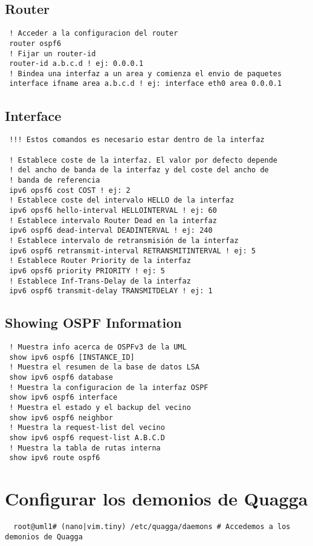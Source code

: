 \documentclass{article}
\begin{document}
\subsection{Router}
\begin{verbatim}
 ! Acceder a la configuracion del router
 router ospf6
 ! Fijar un router-id
 router-id a.b.c.d ! ej: 0.0.0.1
 ! Bindea una interfaz a un area y comienza el envio de paquetes
 interface ifname area a.b.c.d ! ej: interface eth0 area 0.0.0.1
\end{verbatim}

\subsection{Interface}
\begin{verbatim}
 !!! Estos comandos es necesario estar dentro de la interfaz

 ! Establece coste de la interfaz. El valor por defecto depende
 ! del ancho de banda de la interfaz y del coste del ancho de
 ! banda de referencia
 ipv6 opsf6 cost COST ! ej: 2
 ! Establece coste del intervalo HELLO de la interfaz
 ipv6 opsf6 hello-interval HELLOINTERVAL ! ej: 60
 ! Establece intervalo Router Dead en la interfaz
 ipv6 ospf6 dead-interval DEADINTERVAL ! ej: 240
 ! Establece intervalo de retransmisión de la interfaz
 ipv6 ospf6 retransmit-interval RETRANSMITINTERVAL ! ej: 5
 ! Establece Router Priority de la interfaz
 ipv6 opsf6 priority PRIORITY ! ej: 5
 ! Establece Inf-Trans-Delay de la interfaz
 ipv6 ospf6 transmit-delay TRANSMITDELAY ! ej: 1
\end{verbatim}

\subsection{Showing OSPF Information}
\begin{verbatim}
 ! Muestra info acerca de OSPFv3 de la UML
 show ipv6 ospf6 [INSTANCE_ID]
 ! Muestra el resumen de la base de datos LSA
 show ipv6 ospf6 database
 ! Muestra la configuracion de la interfaz OSPF
 show ipv6 ospf6 interface
 ! Muestra el estado y el backup del vecino
 show ipv6 ospf6 neighbor
 ! Muestra la request-list del vecino
 show ipv6 ospf6 request-list A.B.C.D
 ! Muestra la tabla de rutas interna
 show ipv6 route ospf6
\end{verbatim}

\section{Configurar los demonios de Quagga}
\begin{verbatim}
  root@uml1# (nano|vim.tiny) /etc/quagga/daemons # Accedemos a los demonios de Quagga
\end{verbatim}
\end{document}
